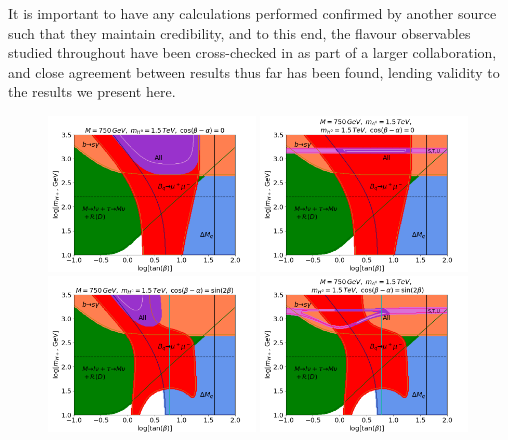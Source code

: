 \documentclass[a4paper,12pt]{article}
\begin{document}
It is important to have any calculations performed confirmed by another source such that they maintain credibility, and to this end, the flavour observables studied throughout have been cross-checked in \cite{tom} as part of a larger collaboration, and close agreement between results thus far has been found, lending validity to the results we present here. 
\begin{figure}[ht]
    \centering
    \includegraphics[width=0.49\textwidth]{../global/global_test.png}
    \includegraphics[width=0.49\textwidth]{../global/global_test2.png}
    \includegraphics[width=0.49\textwidth]{../global/global_test5.png}
    \includegraphics[width=0.49\textwidth]{../global/global_test6.png}

\end{figure}
\end{document}
